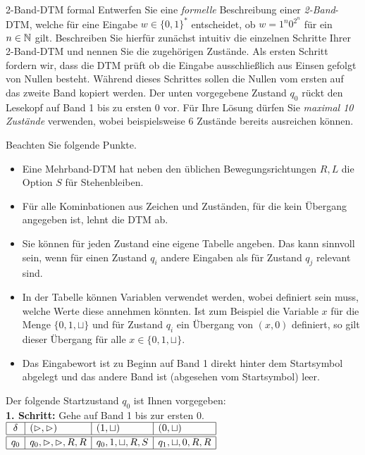 \documentclass[answers]{submit}
\begin{document}
\begin{exercise}[6]{2-Band-DTM formal}
  Entwerfen Sie eine \emph{formelle} Beschreibung einer \emph{2-Band}-DTM, welche für eine Eingabe $w\in\{0,1\}^*$ entscheidet, ob $w=1^n0^{2^n}$ für ein $n\in \mathbb{N}$ gilt.
  Beschreiben Sie hierfür zunächst intuitiv die einzelnen Schritte Ihrer 2-Band-DTM und nennen Sie die zugehörigen Zustände.
  Als ersten Schritt fordern wir, dass die DTM prüft ob die Eingabe ausschließlich aus Einsen gefolgt von Nullen besteht.
  Während dieses Schrittes sollen die Nullen vom ersten auf das zweite Band kopiert werden.
  Der unten vorgegebene Zustand $q_0$ rückt den Lesekopf auf Band 1 bis zu ersten $0$ vor.
  Für Ihre Lösung dürfen Sie \emph{maximal 10 Zustände} verwenden, wobei beispielsweise 6 Zustände bereits ausreichen können.


  Beachten Sie folgende Punkte.
  \begin{itemize}
    \item Eine Mehrband-DTM hat neben den üblichen Bewegungsrichtungen $R,L$ die Option $S$ für Stehenbleiben.
    \item Für alle Kominbationen aus Zeichen und Zuständen, für die kein Übergang angegeben ist, lehnt die DTM ab.
    \item Sie können für jeden Zustand eine eigene Tabelle angeben.
          Das kann sinnvoll sein, wenn für einen Zustand $q_i$ andere Eingaben als für Zustand $q_j$ relevant sind.
    \item In der Tabelle können Variablen verwendet werden, wobei definiert sein muss, welche Werte diese annehmen könnten.
          Ist zum Beispiel die Variable $x$ für die Menge $ \{ 0,1,\sqcup \}$ und für Zustand $q_i$ ein Übergang von $(x,0)$ definiert, so gilt dieser Übergang für alle $x\in \{ 0,1,\sqcup \}$.
    \item Das Eingabewort ist zu Beginn auf Band 1 direkt hinter dem Startsymbol abgelegt und das andere Band ist (abgesehen vom Startsymbol) leer.
  \end{itemize}

  Der folgende Startzustand $q_0$ ist Ihnen vorgegeben:\\

  \textbf{1. Schritt:} Gehe auf Band 1 bis zur ersten 0.\\

  $\begin{array}{|c|l|l|l|l}
      \hline
      \delta & (\rhd,\rhd)        & (1,\sqcup)       & (0,\sqcup)       \\
      \hline
      \hline
      q_0    & q_0, \rhd,\rhd,R,R & q_0,1,\sqcup,R,S & q_1,\sqcup,0,R,R
      \\
      \hline
    \end{array}$
  \answer{

}
\end{exercise}
\end{document}
